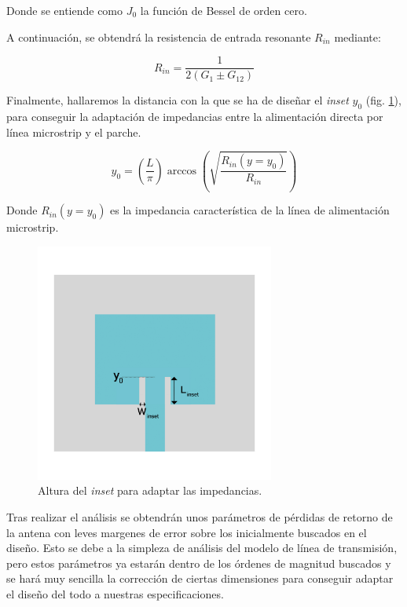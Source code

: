 Donde se entiende como \textit{$J_{0}$} la función de Bessel de orden cero.
\\
\par A continuación, se obtendrá la resistencia de entrada resonante \textit{$R_{in}$} mediante:

\begin{equation}
	R_{in}=\frac{1}{2(G_{1}\pm G_{12})}
	\label{eq:rin}
\end{equation}

\par Finalmente, hallaremos la distancia con la que se ha de diseñar el  \textit{inset} \textit{$y_{0}$} (fig. \ref{fig:inset}),  para conseguir la adaptación de impedancias entre la alimentación directa por línea microstrip y el parche.

\begin{equation}
	y_{0}=\left ( \frac{L}{\pi} \right )\arccos\left ( \sqrt{\frac{R_{in}(y=y_{0})}{R_{in}}} \right )
	\label{eq:yo}
\end{equation}

Donde \textit{$R_{in}(y=y_{0})$} es la impedancia característica de la línea de alimentación microstrip.

\begin{figure}[h]
    \centering
        \includegraphics[width=0.7\textwidth]{archivos/parche/inset}
        \caption{Altura del \textit{inset} para adaptar las impedancias.}
        \label{fig:inset}
\end{figure}

\par Tras realizar el análisis se obtendrán unos parámetros de pérdidas de retorno de la antena con leves margenes de error sobre los inicialmente buscados en el diseño. Esto se debe a la simpleza de análisis del modelo de línea de transmisión, pero estos parámetros ya estarán dentro de los órdenes de magnitud buscados y se hará muy sencilla la corrección de ciertas dimensiones para conseguir adaptar el diseño del todo a nuestras especificaciones.

